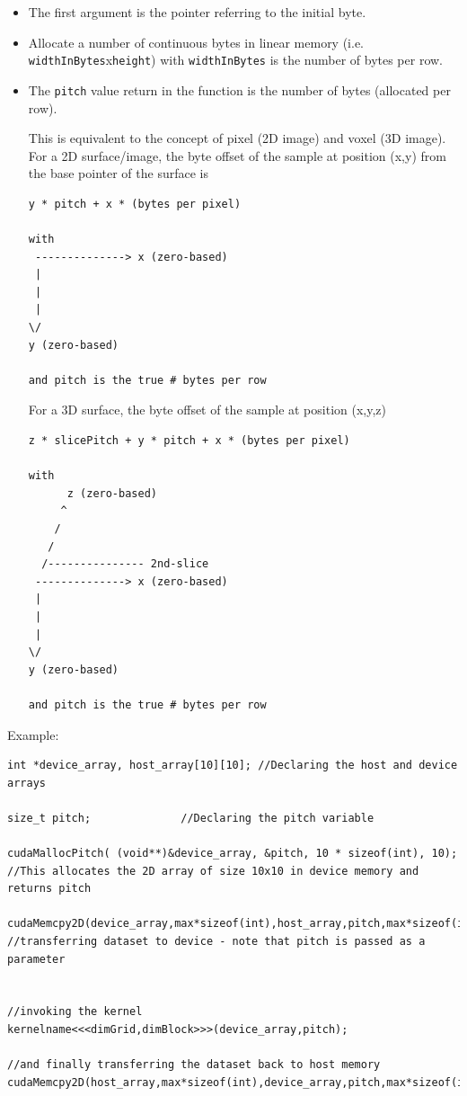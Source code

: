 \begin{itemize}
  \item The first argument is the pointer referring to the initial
    byte.

  \item Allocate a number of continuous bytes in linear memory
    (i.e. \verb!widthInBytes!x\verb!height!) with \verb!widthInBytes!
    is the number of bytes per row. 


  \item The \verb!pitch! value return in the function is the number of
    bytes (allocated per row). 

    This is equivalent to the concept of pixel (2D image) and voxel
    (3D image).  For a 2D surface/image, the byte offset of the sample
    at position  (x,y) from the base pointer of the surface is
\begin{verbatim}
y * pitch + x * (bytes per pixel) 

with 
 --------------> x (zero-based)
 |
 |
 |
\/
y (zero-based)

and pitch is the true # bytes per row
\end{verbatim}

    For a 3D surface, the byte offset of the sample at position (x,y,z) 
\begin{verbatim}
z * slicePitch + y * pitch + x * (bytes per pixel) 

with
      z (zero-based)
     ^
    /
   / 
  /--------------- 2nd-slice
 --------------> x (zero-based)
 |
 |
 |
\/
y (zero-based)

and pitch is the true # bytes per row

\end{verbatim}

    
  \end{itemize}

Example:
\begin{lstlisting}
int *device_array, host_array[10][10]; //Declaring the host and device arrays

size_t pitch;              //Declaring the pitch variable

cudaMallocPitch( (void**)&device_array, &pitch, 10 * sizeof(int), 10); //This allocates the 2D array of size 10x10 in device memory and returns pitch

cudaMemcpy2D(device_array,max*sizeof(int),host_array,pitch,max*sizeof(int),max,cudaMemcpyHostToDevice);
//transferring dataset to device - note that pitch is passed as a parameter


//invoking the kernel
kernelname<<<dimGrid,dimBlock>>>(device_array,pitch);

//and finally transferring the dataset back to host memory
cudaMemcpy2D(host_array,max*sizeof(int),device_array,pitch,max*sizeof(int),max,cudaMemcpyHostToDevice);
\end{lstlisting}

